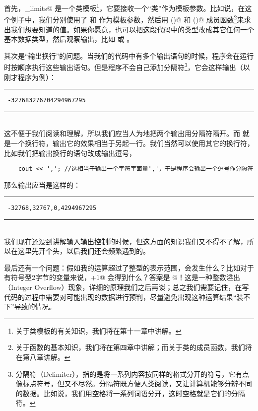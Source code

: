 首先，\lstinline@numeric_limits@ 是一个类模板\footnote{关于类模板的有关知识，我们将在第十一章中讲解。}，它要接收一个``类''作为模板参数。比如说，在这个例子中，我们分别使用了 \lstinline@short@ 和 \lstinline@unsigned@ 作为模板参数，然后用 \lstinline@lowest()@ 和 \lstinline@max()@ 成员函数\footnote{关于函数的基本知识，我们将在第四章中讲解；而关于类的成员函数，我们将在第八章讲解。}来求出我们想要知道的值。如果你愿意，也可以把这段代码中的类型改成其它任何一个基本数据类型，然后观察输出，比如 \lstinline@double@ 或 \lstinline@char@。\par
其次是``输出换行''的问题。当我们的代码中有多个输出语句的时候，程序会在运行时按顺序执行这些输出语句。但是程序不会自己添加分隔符\footnote{分隔符（Delimiter），指的是将一系列内容按同样的格式分开的符号，它有点像标点符号，但又不尽然。分隔符既方便人类阅读，又让计算机能够分辨不同的数据。比如说，我们用空格将一系列词语分开，这时空格就是它们的分隔符。}，它会这样输出（以刚才程序为例）：\\\noindent\rule{\textwidth}{.2pt}\texttt{
-327683276704294967295
}\\\noindent\rule{\textwidth}{.2pt}\\
这不便于我们阅读和理解，所以我们应当人为地把两个输出用分隔符隔开。而 \lstinline@cout@ 就是一个换行符，输出它的效果相当于另起一行。我们当然可以使用其它的换行符，比如我们把输出换行的语句改成输出逗号，
\begin{lstlisting}
    cout << ','; //这相当于输出一个字符字面量','，于是程序会输出一个逗号作分隔符
\end{lstlisting}
那么输出应当是这样的：\\\noindent\rule{\textwidth}{.2pt}\texttt{
-32768,32767,0,4294967295
}\\\noindent\rule{\textwidth}{.2pt}\\
我们现在还没到讲解输入输出控制的时候，但这方面的知识我们又不得不了解，所以在这里先开个头，以后我们还会频繁遇到的。\par
最后还有一个问题：假如我的运算超过了整型的表示范围，会发生什么？比如对于有符号型2字节的变量来说，+1@ 会得到什么？答案是 @！这是一种整数溢出（Integer Overflow）现象，详细的原理我们之后再谈；总之我们需要记住，在写代码的过程中需要对可能出现的数据进行预判，尽量避免出现这种运算结果``装不下''导致的情况。\par
